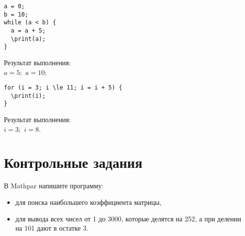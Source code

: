 \begin{verbatim}
a = 0;
b = 10;
while (a < b) {
  a = a + 5;
  \print(a);
}
\end{verbatim}

Результат выполнения:\\
$a = 5;$
$a = 10;$

\begin{verbatim}
for (i = 3; i \le 11; i = i + 5) { 
  \print(i);
}
\end{verbatim}

Результат выполнения:\\
$i = 3;$ 
$i = 8.$

\section{Контрольные задания}
В  Mathpar напишите программу:

\begin{itemize}
  \item для поиска наибольшего коэффициента матрицы, 
  \item для вывода всех чисел от 1 до 3000,  которые делятся на 252,  а при делении на 101 дают в остатке 3. 
\end{itemize}
